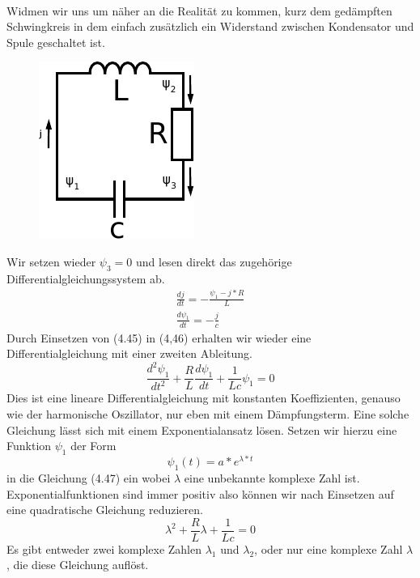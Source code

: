 \documentclass[11pt,a4paper,leqno]{report}
\numberwithin{equation}{chapter}
\begin{document}
\\
Widmen wir uns um n\"aher an die Realit\"at zu kommen, kurz dem ged\"ampften Schwingkreis in dem einfach zus\"atzlich ein Widerstand zwischen Kondensator und Spule geschaltet ist.
  \begin{figure}[H]
	\begin{center}
		\includegraphics[scale=1]{schnwingkreis_gedampft.pdf}
	\end{center}
\end{figure}
\noindent
Wir setzen wieder $\psi_3=0$ und lesen direkt das zugeh\"orige Differentialgleichungssystem ab.
\begin{align}
	\frac{dj}{dt} = -\frac{\psi_1 - j*R}{L}\\
	\frac{d\psi_1}{dt} = -\frac{j}{c}
\end{align}
Durch Einsetzen von (4.45) in (4,46) erhalten wir wieder eine Differentialgleichung mit einer zweiten Ableitung.
\begin{equation}
	\frac{d^2\psi_1}{dt^2} + \frac{R}{L}\frac{d\psi_1}{dt} + \frac{1}{Lc}\psi_1 = 0
\end{equation}
Dies ist eine lineare Differentialgleichung mit konstanten Koeffizienten, genauso wie der harmonische Oszillator, nur eben mit einem D\"ampfungsterm. Eine solche Gleichung l\"asst sich mit einem Exponentialansatz l\"osen. Setzen wir hierzu eine Funktion $\psi_1$ der Form
\begin{equation}
\psi_1(t) = a*e^{\lambda*t}
\end{equation}
in die Gleichung (4.47) ein wobei $\lambda$ eine unbekannte komplexe Zahl ist. 
Exponentialfunktionen sind immer positiv also k\"onnen wir nach Einsetzen auf eine quadratische Gleichung reduzieren.
\begin{equation}
\lambda^2 + \frac{R}{L}\lambda + \frac{1}{Lc} = 0
\end{equation}
Es gibt entweder zwei komplexe Zahlen $\lambda_1$ und $\lambda_2$, oder nur eine komplexe Zahl $\lambda$, die diese Gleichung aufl\"ost. 
\end{document}
